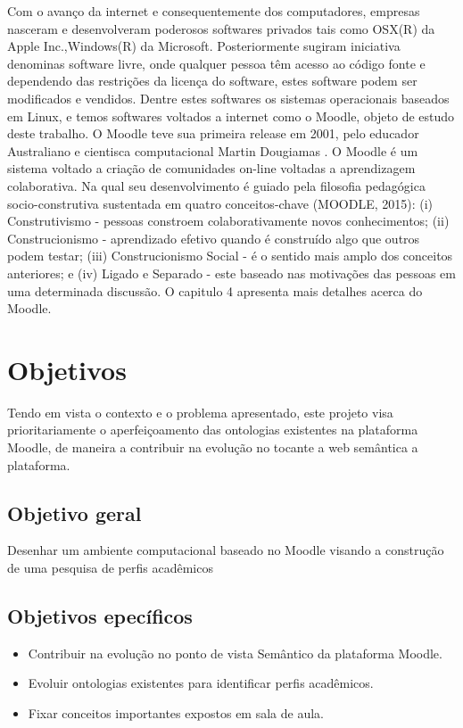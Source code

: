 Com o avanço da internet e consequentemente dos computadores, empresas nasceram e desenvolveram poderosos softwares privados tais como OSX(R) da Apple Inc.,Windows(R) da Microsoft. Posteriormente sugiram iniciativa denominas software livre, onde qualquer pessoa têm acesso ao código fonte e dependendo das restrições da licença do software, estes software podem ser modificados e vendidos. Dentre estes softwares os sistemas operacionais baseados em Linux, e temos softwares voltados a internet como o Moodle, objeto de estudo deste trabalho. O Moodle teve sua primeira release em 2001, pelo educador Australiano e cientisca computacional Martin Dougiamas \cite{moodle}. O Moodle é um sistema voltado a criação de comunidades on-line voltadas a aprendizagem colaborativa. Na qual seu desenvolvimento é guiado pela filosofia pedagógica socio-construtiva sustentada em quatro conceitos-chave (MOODLE, 2015): (i) Construtivismo - pessoas constroem colaborativamente novos conhecimentos; (ii) Construcionismo - aprendizado efetivo quando é construído algo que outros podem testar; (iii) Construcionismo Social - é o sentido mais amplo dos conceitos anteriores; e (iv) Ligado e Separado - este baseado nas motivações das pessoas em uma determinada discussão. O capitulo  4 apresenta mais detalhes acerca do Moodle.

\section{Objetivos}
Tendo em vista o contexto e o problema apresentado, este projeto visa prioritariamente o aperfeiçoamento das ontologias existentes na plataforma Moodle, de maneira a contribuir na evolução no tocante a web semântica a plataforma.
\subsection{Objetivo geral}
	Desenhar um ambiente computacional baseado no Moodle visando a construção de uma pesquisa de perfis acadêmicos
\subsection{Objetivos epecíficos}
\begin{itemize}
  \item Contribuir na evolução no ponto de vista Semântico da plataforma Moodle.
  \item Evoluir ontologias existentes para identificar perfis acadêmicos.
	\item Fixar conceitos importantes expostos em sala de aula.
\end{itemize}

